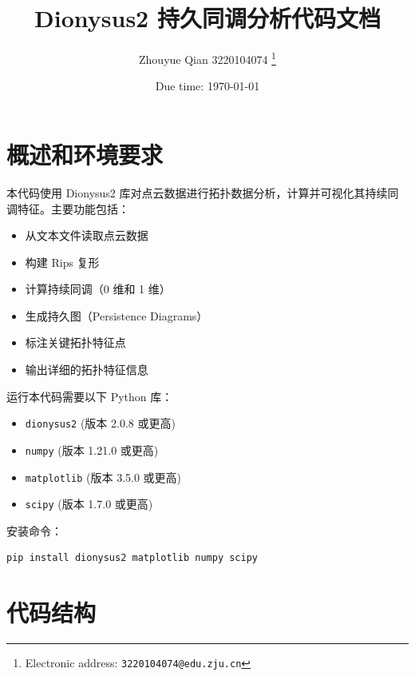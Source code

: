 \documentclass[a4paper]{article}
\begin{document}
\title{Dionysus2 持久同调分析代码文档}

\author{Zhouyue Qian 3220104074
  \thanks{Electronic address: \texttt{3220104074@edu.zju.cn}}}


\date{Due time: \today}

\maketitle

\section{概述和环境要求}
本代码使用 Dionysus2 库对点云数据进行拓扑数据分析，计算并可视化其持续同调特征。主要功能包括：
\begin{itemize}
    \item 从文本文件读取点云数据
    \item 构建 Rips 复形
    \item 计算持续同调（0 维和 1 维）
    \item 生成持久图（Persistence Diagrams）
    \item 标注关键拓扑特征点
    \item 输出详细的拓扑特征信息
\end{itemize}
运行本代码需要以下 Python 库：
\begin{itemize}
    \item \texttt{dionysus2} (版本 2.0.8 或更高)
    \item \texttt{numpy} (版本 1.21.0 或更高)
    \item \texttt{matplotlib} (版本 3.5.0 或更高)
    \item \texttt{scipy} (版本 1.7.0 或更高)
\end{itemize}
安装命令：
\begin{lstlisting}[language=bash]
pip install dionysus2 matplotlib numpy scipy
\end{lstlisting}

\section{代码结构}
\end{document}
